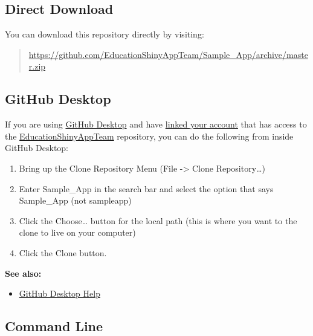 \documentclass[
]{book}
\providecommand{\tightlist}{%
  \setlength{\itemsep}{0pt}\setlength{\parskip}{0pt}}
\begin{document}
\hypertarget{direct-download}{%
\subsection{Direct Download}\label{direct-download}}

You can download this repository directly by visiting:

\begin{quote}
\url{https://github.com/EducationShinyAppTeam/Sample_App/archive/master.zip}
\end{quote}

\hypertarget{github-desktop}{%
\subsection{GitHub Desktop}\label{github-desktop}}

If you are using \href{https://desktop.github.com/}{GitHub Desktop} and have \href{https://help.github.com/en/desktop/getting-started-with-github-desktop/authenticating-to-github}{linked your account} that has access to the \href{https://github.com/EducationShinyAppTeam}{EducationShinyAppTeam} repository, you can do the following from inside GitHub Desktop:

\begin{enumerate}
\def\labelenumi{\arabic{enumi}.}
\tightlist
\item
  Bring up the Clone Repository Menu (File -\textgreater{} Clone Repository\ldots)\\
\item
  Enter Sample\_App in the search bar and select the option that says Sample\_App (not sampleapp)
\item
  Click the Choose\ldots{} button for the local path (this is where you want to the clone to live on your computer)
\item
  Click the Clone button.
\end{enumerate}

\textbf{See also:}

\begin{itemize}
\tightlist
\item
  \href{https://help.github.com/en/desktop}{GitHub Desktop Help}
\end{itemize}

\hypertarget{command-line}{%
\subsection{Command Line}\label{command-line}}
\end{document}
